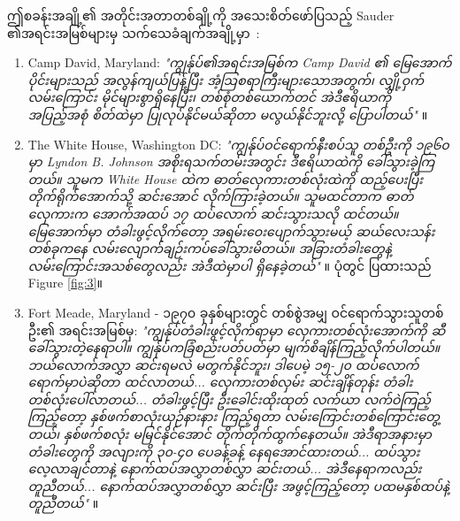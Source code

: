 \documentclass[10pt,twocolumn,letterpaper]{article}
\begin{document}
ဤစခန်းအချို့၏ အတိုင်းအတာတစ်ချို့ကို အသေးစိတ်ဖော်ပြသည့် Sauder ၏အရင်းအမြစ်များမှ သက်သေခံချက်အချို့မှာ\ :
\begin{flushleft}
\begin{enumerate}
    \item Camp David, Maryland: \textit{"ကျွန်ုပ်၏အရင်းအမြစ်က Camp David ၏ မြေအောက်ပိုင်းများသည် အလွန်ကျယ်ပြန့်ပြီး အံ့ဩစရာကြီးများသောအတွက်၊ လျှို့ဝှက်လမ်းကြောင်း မိုင်များစွာရှိနေပြီး၊ တစ်စုံတစ်ယောက်တင် အဲဒီဧရိယာကို အပြည့်အစုံ စိတ်ထဲမှာ ပြုလုပ်နိုင်မယ်ဆိုတာ မလွယ်နိုင်ဘူးလို့ ပြောပါတယ်"} \cite{22}။
    \item The White House, Washington DC: \textit{"ကျွန်ုပ်ဝင်ရောက်နီးစပ်သူ တစ်ဦးကို ၁၉၆၀ မှာ Lyndon B. Johnson အစိုးရသက်တမ်းအတွင်း ဒီဧရိယာထဲကို ခေါ်သွားခဲ့ကြတယ်။ သူမက White House ထဲက ဓာတ်လှေကားတစ်လုံးထဲကို ထည့်ပေးပြီး တိုက်ရိုက်အောက်သို့ ဆင်းအောင် လိုက်ကြားခဲ့တယ်။ သူမထင်တာက ဓာတ်လှေကားက အောက်အထပ် ၁၇ ထပ်လောက် ဆင်းသွားသလို ထင်တယ်။ မြေအောက်မှာ တံခါးဖွင့်လိုက်တော့ အရမ်းဝေးပျောက်သွားမယ့် ဆယ်လေးသန်းတစ်ခုကနေ လမ်းလျောက်ချဉ်းကပ်ခေါ်သွားမိတယ်။ အခြားတံခါးတွေနဲ့ လမ်းကြောင်းအသစ်တွေလည်း အဲဒီထဲမှာပါ ရှိနေခဲ့တယ်"} \cite{22}။ ပုံတွင် ပြထားသည် Figure \ref{fig:3}။
    \item Fort Meade, Maryland - ၁၉၇၀ ခုနှစ်များတွင် တစ်စွဲအမျှ ဝင်ရောက်သွားသူတစ်ဦး၏ အရင်းအမြစ်မှ: \textit{"ကျွန်ုပ်တံခါးဖွင့်လိုက်ရာမှာ လှေကားတစ်လုံးအောက်ကို ဆီခေါ်သွားတဲ့နေရာပါ။ ကျွန်ုပ်ကခြံစည်းပတ်ပတ်မှာ မျက်စိချိန်ကြည့်လိုက်ပါတယ်။ ဘယ်လောက်အလွှာ ဆင်းရမလဲ မတွက်နိုင်ဘူး၊ ဒါပေမဲ့ ၁၅-၂၀ ထပ်လောက်ရောက်မှာပဲဆိုတာ ထင်လာတယ်... လှေကားတစ်လှမ်း ဆင်းချိန်တုန်း တံခါးတစ်လုံးပေါ်လာတယ်... တံခါးဖွင့်ပြီး ဦးခေါင်းထိုးထုတ် လက်ယာ လက်ဝဲကြည့်ကြည့်တော့ နှစ်ဖက်စာလုံးယှဉ်နားနား ကြည့်ရတာ လမ်းကြောင်းတစ်ကြောင်းတွေ့တယ်၊ နှစ်ဖက်စလုံး မမြင်နိုင်အောင် တိုက်တိုက်ထွက်နေတယ်။ အဲဒီရာအနားမှာ တံခါးတွေကို အလျားကို ၃၀-၄၀ ပေခန့်ခန့် နေရအောင်ထားတယ်... ထပ်သွားလေ့လာချင်တာနဲ့ နောက်ထပ်အလွှာတစ်လွှာ ဆင်းတယ်... အဲဒီနေရာကလည်း တူညီတယ်... နောက်ထပ်အလွှာတစ်လွှာ ဆင်းပြီး အဖွင့်ကြည့်တော့ ပထမနှစ်ထပ်နဲ့ တူညီတယ်"} \cite{22}။
\end{enumerate}
\end{flushleft}
\end{document}
